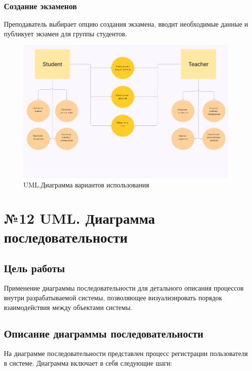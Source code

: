 \documentclass[a4paper,12pt]{article}
\begin{document}
\subsubsection{Создание экзаменов}
Преподаватель выбирает опцию создания экзамена, вводит необходимые данные и публикует экзамен для группы студентов.

\begin{figure}[-h]
    \centering
    \includegraphics[width=1\linewidth]{UML_variation_use.png}
    \caption{UML.Диаграмма вариантов использования}
\end{figure}

\section{№12 UML. Диаграмма последовательности}

\subsection{Цель работы}
Применение диаграммы последовательности для детального описания процессов внутри разрабатываемой системы, позволяющее визуализировать порядок взаимодействия между объектами системы.

\subsection{Описание диаграммы последовательности}
На диаграмме последовательности представлен процесс регистрации пользователя в системе. Диаграмма включает в себя следующие шаги:
\end{document}
